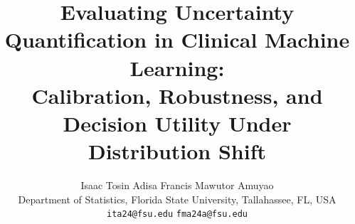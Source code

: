 \documentclass[11pt,a4paper]{article}
\begin{document}
\title{\textbf{Evaluating Uncertainty Quantification in Clinical Machine Learning:}\\
\textbf{Calibration, Robustness, and Decision Utility Under Distribution Shift}}

\author{
  Isaac Tosin Adisa \quad Francis Mawutor Amuyao \\[4pt]
  \small Department of Statistics, Florida State University, Tallahassee, FL, USA \\
  \small \texttt{ita24@fsu.edu} \quad \texttt{fma24a@fsu.edu}
}

\date{}
\maketitle
\end{document}
